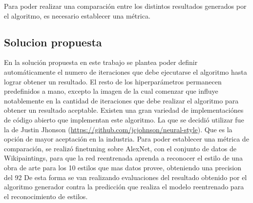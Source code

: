 \documentclass[a4paper,10pt]{article}
\begin{document}
    Para poder realizar una comparación entre los distintos resultados generados por el algoritmo, es necesario establecer una métrica.
  \subsection{Solucion propuesta}
    En la solución propuesta en este trabajo se plantea poder definir automáticamente el numero de iteraciones que debe ejecutarse el algoritmo hasta lograr obtener un resultado.
    El resto de los hiperparámetros permanecen predefinidos a mano, excepto la imagen de la cual comenzar que influye notablemente en la cantidad de iteraciones que debe realizar el 
    algoritmo para obtener un resultado aceptable.
    Existen una gran variedad de implementaciónes de código abierto que implementan este algoritmo. La que se decidió utilizar fue la de Justin Jhonson (\url{https://github.com/jcjohnson/neural-style}).
    Que es la opción de mayor aceptación en la industria.
    Para poder establecer una métrica de comparación, se realizó finetuning sobre AlexNet, con el conjunto de datos de Wikipaintings, para que la red reentrenada aprenda a reconocer
    el estilo de una obra de arte para los 10 estilos que mas datos provee, obteniendo una precision del 92%
    De esta forma se van realizando evaluaciones del resultado obtenido por el algoritmo generador contra la predicción que realiza el modelo reentrenado para el reconocimiento de estilos.
    
    
\end{document}
